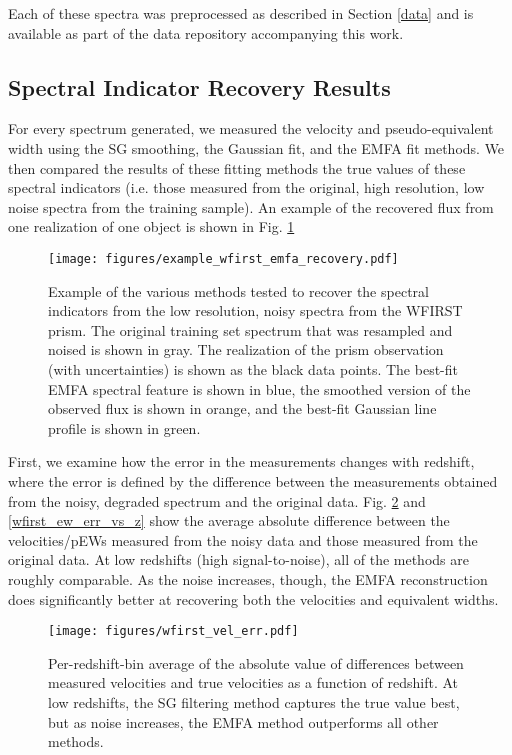 Each of these spectra was preprocessed as described in Section \ref{data} and is available as part of the data repository accompanying this work.

\subsection{Spectral Indicator Recovery Results}
For every spectrum generated, we measured the velocity and pseudo-equivalent width using the SG smoothing, the Gaussian fit, and the EMFA fit methods. We then compared the results of these fitting methods the true values of these spectral indicators (i.e. those measured from the original, high resolution, low noise spectra from the training sample). An example of the recovered flux from one realization of one object is shown in Fig. \ref{example_wfirst_recovery}

\begin{figure}[!htb]
    \centering
    \texttt{[image: figures/example\_wfirst\_emfa\_recovery.pdf]}
    \caption{Example of the various methods tested to recover the spectral indicators from the low resolution, noisy spectra from the WFIRST prism. The original training set spectrum that was resampled and noised is shown in gray. The realization of the prism observation (with uncertainties) is shown as the black data points. The best-fit EMFA spectral feature is shown in blue, the smoothed version of the observed flux is shown in orange, and the best-fit Gaussian line profile is shown in green.}
    \label{example_wfirst_recovery}
\end{figure}

First, we examine how the error in the measurements changes with redshift, where the error is defined by the difference between the measurements obtained from the noisy, degraded spectrum and the original data. Fig. \ref{wfirst_vel_err_vs_z} and \ref{wfirst_ew_err_vs_z} show the average absolute difference between the velocities/pEWs measured from the noisy data and those measured from the original data. At low redshifts (high signal-to-noise), all of the methods are roughly comparable. As the noise increases, though, the EMFA reconstruction does significantly better at recovering both the velocities and equivalent widths.

\begin{figure}[!htb]
    \centering
    \texttt{[image: figures/wfirst\_vel\_err.pdf]}
    \caption{Per-redshift-bin average of the absolute value of differences between measured velocities and true velocities as a function of redshift. At low redshifts, the SG filtering method captures the true value best, but as noise increases, the EMFA method outperforms all other methods.}
    \label{wfirst_vel_err_vs_z}
\end{figure}


